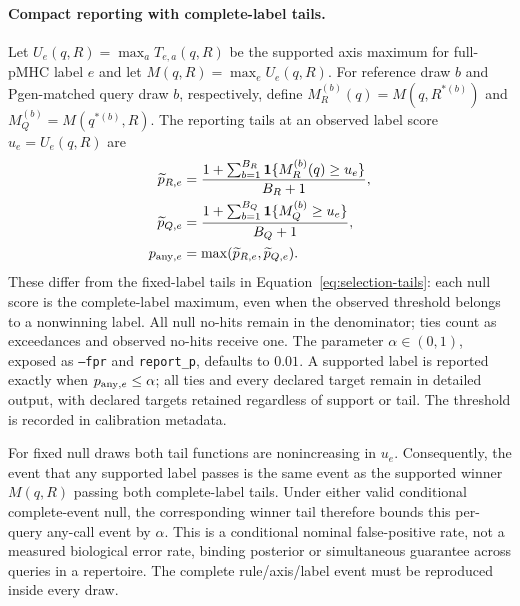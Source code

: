\documentclass[10pt,a4paper]{article}
\theoremstyle{definition}
\begin{document}
\paragraph{Compact reporting with complete-label tails.}
Let $U_e(q,R)=\max_a T_{e,a}(q,R)$ be the supported axis maximum for full-pMHC label $e$ and let $M(q,R)=\max_e U_e(q,R)$.
For reference draw $b$ and Pgen-matched query draw $b$, respectively, define
$M_R^{(b)}(q)=M(q,R^{*(b)})$ and $M_Q^{(b)}=M(q^{*(b)},R)$.
The reporting tails at an observed label score $u_e=U_e(q,R)$ are
\[
\begin{aligned}
 \widetilde p_{R,e}&=\frac{1+\sum_{b=1}^{B_R}\mathbf1\{M_R^{(b)}(q)\ge u_e\}}{B_R+1},\\
 \widetilde p_{Q,e}&=\frac{1+\sum_{b=1}^{B_Q}\mathbf1\{M_Q^{(b)}\ge u_e\}}{B_Q+1},\\
 p_{{\rm any},e}&=\max(\widetilde p_{R,e},\widetilde p_{Q,e}).
\end{aligned}
\]
These differ from the fixed-label tails in Equation~\eqref{eq:selection-tails}: each null score is the complete-label maximum, even when the observed threshold belongs to a nonwinning label.
All null no-hits remain in the denominator; ties count as exceedances and observed no-hits receive one.
The parameter $\alpha\in(0,1)$, exposed as \texttt{--fpr} and \texttt{report\_p}, defaults to $0.01$.
A supported label is reported exactly when $p_{{\rm any},e}\le\alpha$; all ties and every declared target remain in detailed output, with declared targets retained regardless of support or tail.
The threshold is recorded in calibration metadata.

For fixed null draws both tail functions are nonincreasing in $u_e$.
Consequently, the event that any supported label passes is the same event as the supported winner $M(q,R)$ passing both complete-label tails.
Under either valid conditional complete-event null, the corresponding winner tail therefore bounds this per-query any-call event by $\alpha$.
This is a conditional nominal false-positive rate, not a measured biological error rate, binding posterior or simultaneous guarantee across queries in a repertoire.
The complete rule/axis/label event must be reproduced inside every draw.
\end{document}
